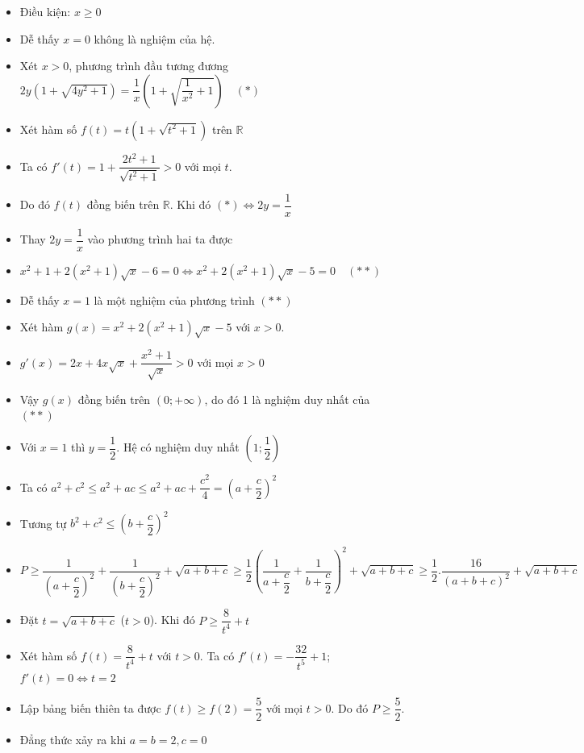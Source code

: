\lgi 
\begin{itemize}[label=,leftmargin=*]
\item Điều kiện: $x\ge 0$
\item Dễ thấy $x=0$ không là nghiệm của hệ.
\item Xét $x> 0$, phương trình đầu tương đương $2y(1+\sqrt{4y^2+1})=\dfrac{1}{x}\left(1+ \sqrt{\dfrac{1}{x^2}+1} \right) \quad (*)$
\item Xét hàm số $f(t)=t(1+\sqrt{t^2+1})$ trên $\mathbb{R}$
\item Ta có $f'(t)=1+\dfrac{2t^2+1}{\sqrt{t^2+1}}>0$ với mọi $t$.
\item Do đó $f(t)$ đồng biến trên $\mathbb{R}$. Khi đó $(*)\Leftrightarrow 2y=\dfrac{1}{x}$
\item Thay $2y=\dfrac{1}{x}$ vào phương trình hai ta được
\item $x^2+1+2(x^2+1)\sqrt{x}-6=0 \Leftrightarrow x^2+2(x^2+1)\sqrt{x}-5=0\quad (**)$
\item Dễ thấy $x=1$ là một nghiệm của phương trình $(**)$
\item Xét hàm $g(x)=x^2+2(x^2+1)\sqrt{x}-5$ với $x>0$.
\item $g'(x)=2x+4x\sqrt{x}+\dfrac{x^2+1}{\sqrt{x}}>0$ với mọi $x>0$
\item Vậy $g(x)$ đồng biến trên $(0;+\infty)$, do đó 1 là nghiệm duy nhất của $(**)$
\item Với $x=1$ thì $y=\dfrac{1}{2}$. Hệ có nghiệm duy nhất $\left(1;\dfrac{1}{2} \right)$
\end{itemize}

\lgi 
\begin{itemize}[label=,leftmargin=*]
\item Ta có $a^2+c^2\le a^2+ac\le a^2+ac+\dfrac{c^2}{4}=\left(a+\dfrac{c}{2}\right)^2$
\item Tương tự $b^2+c^2\le \left(b+\dfrac{c}{2} \right)^2$
\item $P\ge \dfrac{1}{\left(a+\dfrac{c}{2}\right)^2}+\dfrac{1}{\left(b+\dfrac{c}{2}\right)^2}+\sqrt{a+b+c}\ge \dfrac{1}{2}\left(\dfrac{1}{a+\dfrac{c}{2}}+\dfrac{1}{b+\dfrac{c}{2}} \right)^2+\sqrt{a+b+c}\ge \dfrac{1}{2}.\dfrac{16}{(a+b+c)^2}+\sqrt{a+b+c}$
\item Đặt $t=\sqrt{a+b+c}$ ($t> 0$). Khi đó $P\ge \dfrac{8}{t^4}+t$
\item Xét hàm số $f(t)=\dfrac{8}{t^4}+t$ với $t>0$. Ta có $f'(t)=-\dfrac{32}{t^5}+1$; $f'(t)=0 \Leftrightarrow t=2$
\item Lập bảng biến thiên ta được $f(t)\ge f(2)=\dfrac{5}{2}$ với mọi $t>0$. Do đó $P\ge \dfrac{5}{2}$.
\item Đẳng thức xảy ra khi $a=b=2,c=0$
\end{itemize}

